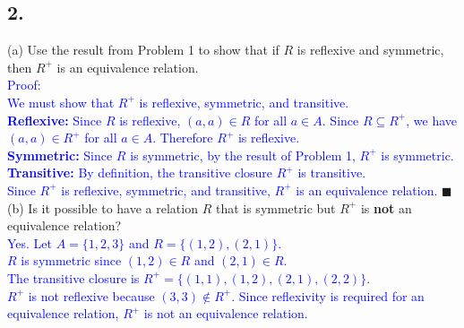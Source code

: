 \documentclass{article}
\begin{document}
\subsection*{2.}
(a) Use the result from Problem 1 to show that if $R$ is reflexive and symmetric, then $R^+$ is an equivalence relation. \\[1em]
\textcolor{blue}{Proof:} \\[0.5em]
\textcolor{blue}{We must show that $R^+$ is reflexive, symmetric, and transitive.} \\[0.5em]
\textcolor{blue}{\textbf{Reflexive:} Since $R$ is reflexive, $(a, a) \in R$ for all $a \in A$. Since $R \subseteq R^+$, we have $(a, a) \in R^+$ for all $a \in A$. Therefore $R^+$ is reflexive.} \\[0.5em]
\textcolor{blue}{\textbf{Symmetric:} Since $R$ is symmetric, by the result of Problem 1, $R^+$ is symmetric.} \\[0.5em]
\textcolor{blue}{\textbf{Transitive:} By definition, the transitive closure $R^+$ is transitive.} \\[0.5em]
\textcolor{blue}{Since $R^+$ is reflexive, symmetric, and transitive, $R^+$ is an equivalence relation.} $\blacksquare$ \\[2em]
(b) Is it possible to have a relation $R$ that is symmetric but $R^+$ is \textbf{not} an equivalence relation? \\[1em]
\textcolor{blue}{Yes. Let $A = \{1, 2, 3\}$ and $R = \{(1, 2), (2, 1)\}$.} \\[0.5em]
\textcolor{blue}{$R$ is symmetric since $(1, 2) \in R$ and $(2, 1) \in R$.} \\[0.5em]
\textcolor{blue}{The transitive closure is $R^+ = \{(1, 1), (1, 2), (2, 1), (2, 2)\}$.} \\[0.5em]
\textcolor{blue}{$R^+$ is not reflexive because $(3, 3) \notin R^+$. Since reflexivity is required for an equivalence relation, $R^+$ is not an equivalence relation.}
\end{document}
